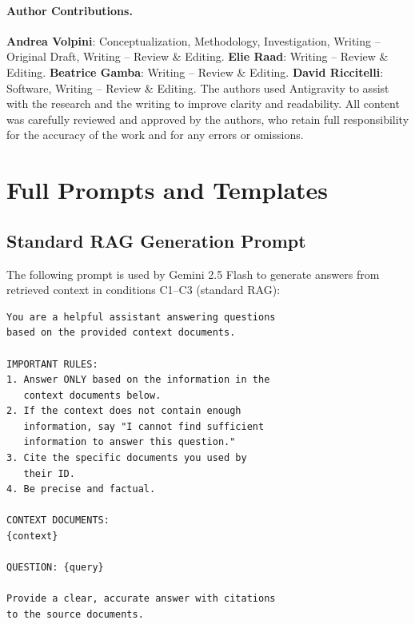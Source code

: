 \documentclass[runningheads]{llncs}
\begin{document}
\paragraph{Author Contributions.}
\textbf{Andrea Volpini}: Conceptualization, Methodology, Investigation,
Writing -- Original Draft, Writing -- Review \& Editing.
\textbf{Elie Raad}: Writing -- Review \& Editing.
\textbf{Beatrice Gamba}: Writing -- Review \& Editing.
\textbf{David Riccitelli}: Software, Writing -- Review \& Editing.
The authors used Antigravity to assist with the research and the writing to
improve clarity and readability.  All content was carefully reviewed and
approved by the authors, who retain full responsibility for the accuracy of
the work and for any errors or omissions.




\appendix

\section{Full Prompts and Templates}
\label{app:prompts}

\subsection{Standard RAG Generation Prompt}

The following prompt is used by Gemini 2.5 Flash to generate answers
from retrieved context in conditions C1--C3 (standard RAG):

\begin{lstlisting}[basicstyle=\small\ttfamily,breaklines=true,frame=single]
You are a helpful assistant answering questions
based on the provided context documents.

IMPORTANT RULES:
1. Answer ONLY based on the information in the
   context documents below.
2. If the context does not contain enough
   information, say "I cannot find sufficient
   information to answer this question."
3. Cite the specific documents you used by
   their ID.
4. Be precise and factual.

CONTEXT DOCUMENTS:
{context}

QUESTION: {query}

Provide a clear, accurate answer with citations
to the source documents.
\end{lstlisting}
\end{document}
